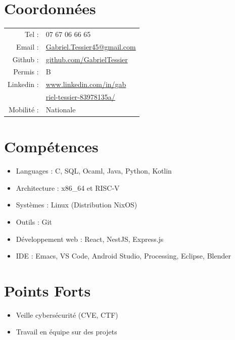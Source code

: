 \documentclass[10pt,oneside,a4paper,titlepage]{article}
\begin{document}
\begin{tcolorbox}
  \begin{minipage}[t]{7cm}
    \vspace*{-0.5cm}
    \begin{tcolorbox}[grow to left by=0.6cm,colback=gray!25,colframe=white,height=22.5cm,valign=top]
      \section*{Coordonnées}
      \setlength{\tabcolsep}{2pt}
      \begin{tabular}{rl}
        Tel : & 07 67 06 66 65 \\
        Email : & \href{mailto:Gabriel.Tessier45@gmail.com}{Gabriel.Tessier45@gmail.com} \\
        Github : & \href{https://github.com/GabrielTessier}{github.com/GabrielTessier} \\
        Permis : & B\\
        Linkedin : & \href{https://www.linkedin.com/in/gabriel-tessier-83978135a/}{www.linkedin.com/in/gab}\\
              & \href{https://www.linkedin.com/in/gabriel-tessier-83978135a/}{riel-tessier-83978135a/}\\
        Mobilité : & Nationale
      \end{tabular}

      \vspace{10pt}
      \section*{Compétences}
      \begin{itemize}
        \renewcommand{\labelitemi}{-}
      \item Languages : C, SQL, Ocaml, Java, Python, Kotlin
      \item Architecture : x86\_64 et RISC-V
      \item Systèmes : Linux (Distribution NixOS)
      \item Outils : Git
      \item Développement web : React, NestJS, Express.js
      \item IDE : Emacs, VS Code, Android Studio, Processing, Eclipse, Blender
      \end{itemize}

      \section*{Points Forts}
      \begin{itemize}
        \renewcommand{\labelitemi}{-}
      \item Veille cybersécurité (CVE, CTF)
      \item Travail en équipe sur des projets
      \end{itemize}
      

\end{tcolorbox}
\end{minipage}
\end{tcolorbox}
\end{document}
